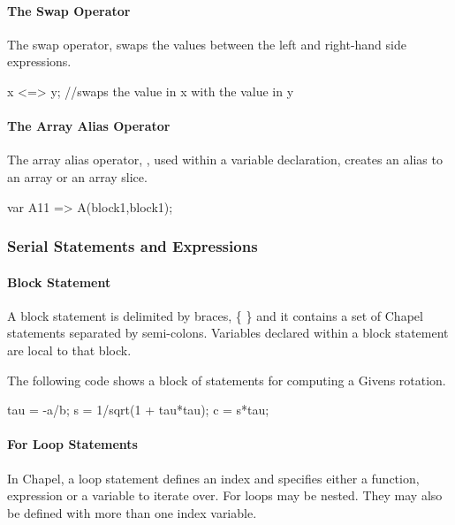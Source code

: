 \paragraph{The Swap Operator}
The swap operator, \chpl{<=>} swaps the values between
the left and right-hand side expressions.
\begin{chapel}
x <=> y; //swaps the value in x with the value in y
\end{chapel}

\paragraph{The Array Alias Operator}
The array alias operator, \chpl{=>}, used within a
variable declaration, creates an alias to an array or 
an array slice.
\begin{chapel}
var A11 => A(block1,block1);
\end{chapel}


\subsubsection{Serial Statements and Expressions}

\paragraph{Block Statement}  
A block statement is delimited by braces, \{ \} and it
contains a set of Chapel statements separated by semi-colons.  
Variables declared within a block statement are local to that block.

\begin{example}
The following code shows a block of statements for computing
a Givens rotation.
\begin{chapel}
{
tau = -a/b;
s = 1/sqrt(1 + tau*tau);
c = s*tau;
}
\end{chapel} 
\end{example} 

\paragraph{For Loop Statements} 
In Chapel, a  loop statement defines an index and
specifies either a function, expression or a variable to
iterate over.  For loops may be nested.  They
may also be defined with more than one index variable.

